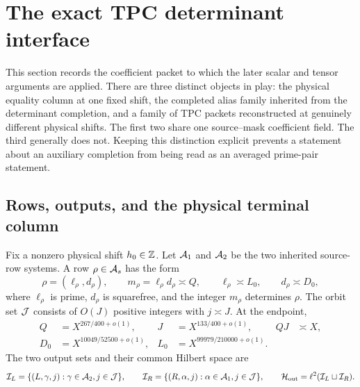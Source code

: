 \section{The exact TPC determinant interface}
\label{sec:tpc46-interface}

This section records the coefficient packet to which the later scalar
and tensor arguments are applied.  There are three distinct objects in
play: the physical equality column at one fixed shift, the completed
alias family inherited from the determinant completion, and a family of
TPC packets reconstructed at genuinely different physical shifts.  The
first two share one source--mask coefficient field.  The third generally
does not.  Keeping this distinction explicit prevents a statement about
an auxiliary completion from being read as an averaged prime-pair
statement.

\subsection{Rows, outputs, and the physical terminal column}

Fix a nonzero physical shift \(h_0\in\mathbb Z\).  Let \(\mathcal A_1\) and
\(\mathcal A_2\) be the two inherited source-row systems.  A row
\(\rho\in\mathcal A_s\) has the form
\begin{equation}
 \rho=(\ell_\rho,d_\rho),\qquad
 m_\rho=\ell_\rho d_\rho\asymp Q,\qquad
 \ell_\rho\asymp L_0,\qquad d_\rho\asymp D_0,
 \label{eq:tpc46-row}
\end{equation}
where \(\ell_\rho\) is prime, \(d_\rho\) is squarefree, and the integer
\(m_\rho\) determines \(\rho\).  The orbit set \(\mathcal J\) consists of
\(O(J)\) positive integers with \(j\asymp J\).  At the endpoint,
\begin{align}
 Q&=X^{267/400+o(1)},
 &J&=X^{133/400+o(1)},
 &QJ&\asymp X,
 \label{eq:tpc46-QJ-scales}\\
 D_0&=X^{10049/52500+o(1)},
 &L_0&=X^{99979/210000+o(1)}.
 \label{eq:tpc46-DL-scales}
\end{align}
The two output sets and their common Hilbert space are
\begin{equation}
 \mathcal I_L=\{(L,\gamma,j):\gamma\in\mathcal A_2, j\in\mathcal J\},
 \qquad
 \mathcal I_R=\{(R,\alpha,j):\alpha\in\mathcal A_1, j\in\mathcal J\},
 \qquad
 \mathcal H_{\rm out}=\ell^2(\mathcal I_L\sqcup\mathcal I_R).
 \label{eq:tpc46-output-space}
\end{equation}

